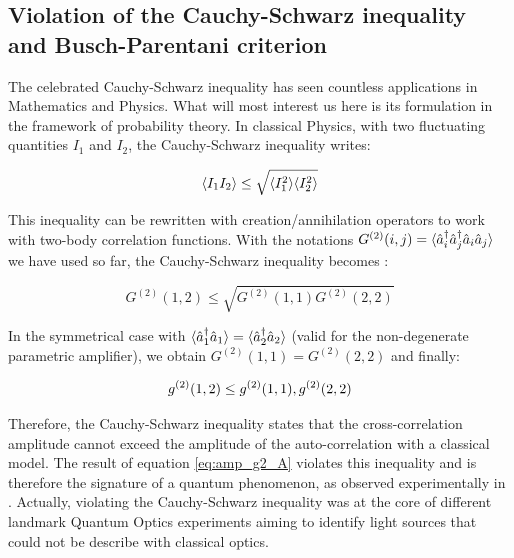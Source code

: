 \subsection{Violation of the Cauchy-Schwarz inequality and Busch-Parentani criterion}

\label{sec:cs_inequality}

The celebrated Cauchy-Schwarz inequality has seen countless applications in Mathematics and Physics. What will most interest us here is its formulation in the framework of probability theory. In classical Physics, with two fluctuating quantities $I_1$ and $I_2$, the Cauchy-Schwarz inequality writes:

\begin{equation}
    \langle I_1 I_2\rangle \leq \sqrt{\langle I_1^2\rangle \langle I_2^2\rangle}
\end{equation}

This inequality can be rewritten with creation/annihilation operators to work with two-body correlation functions. With the notations $G^{(2)}(i,j) = \langle\hat{a}_i^{\dagger} \hat{a}_j^{\dagger} \hat{a}_i \hat{a}_j\rangle$ we have used so far, the Cauchy-Schwarz inequality becomes \cite{walls2008}:

\begin{equation}
    G^{(2)}(1,2) \leq \sqrt{G^{(2)}(1,1) G^{(2)}(2,2) }
\end{equation}

In the symmetrical case with $\langle\hat{a}^{\dagger}_1 \hat{a}_1\rangle=\langle\hat{a}^{\dagger}_2 \hat{a}_2\rangle$ (valid for the non-degenerate parametric amplifier), we obtain $G^{(2)}(1,1)=G^{(2)}(2,2)$ and finally:

\begin{equation}
    g^{(2)} (1,2) \leq g^{(2)} (1,1), g^{(2)} (2,2)
\end{equation}


Therefore, the Cauchy-Schwarz inequality states that the cross-correlation amplitude cannot exceed the amplitude of the auto-correlation with a classical model. The result of equation \ref{eq:amp_g2_A} violates this inequality and is therefore the signature of a quantum phenomenon, as observed experimentally in \cite{zou1991violation}. Actually, violating the Cauchy-Schwarz inequality was at the core of different landmark Quantum Optics experiments \cite{reid1986violations} aiming to identify light sources that could not be describe with classical optics.




